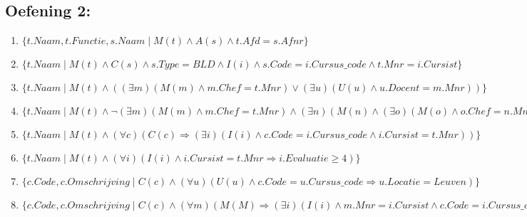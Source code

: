 \documentclass[../Oefenzitting5.tex]{subfiles}
\begin{document}
	\subsection{Oefening 2:}
	\begin{enumerate}
		\item
			$ \{ t.Naam , t.Functie, s.Naam \mid M(t) \wedge A(s) \wedge t.Afd = s.Afnr \} $

	   \item
		   $ \{ t.Naam \mid M(t) \wedge C(s) \wedge s.Type = BLD \wedge I(i) \wedge s.Code = i.Cursus\_code \wedge t.Mnr = i.Cursist \} $ 
		   
		\item
			$ \{ t.Naam \mid M(t) \wedge ((\exists{m}) (M(m) \wedge m.Chef = t.Mnr) \vee (\exists{u}) (U(u) \wedge u.Docent = m.Mnr )) \} $
			
		\item
			$ \{ t.Naam \mid M(t) \wedge \neg (\exists{m})(M(m) \wedge m.Chef = t.Mnr) \wedge (\exists{n})(M(n) \wedge (\exists{o})(M(o) \wedge o.Chef = n.Mnr) \wedge n.Salaris < t.Salaris) \} $
			
		\item
			$ \{ t.Naam \mid M(t) \wedge (\forall{c}) (C(c) \Rightarrow (\exists{i}) (I(i) \wedge c.Code = i.Cursus\_code \wedge i.Cursist = t.Mnr)) \} $
			
		\item
			$ \{ t.Naam \mid M(t) \wedge (\forall{i}) (I(i) \wedge i.Cursist = t.Mnr \Rightarrow i.Evaluatie \geq 4) \} $
			
		\item
			$ \{ c.Code, c.Omschrijving \mid C(c) \wedge (\forall{u}) (U(u) \wedge c.Code = u.Cursus\_code \Rightarrow u.Locatie = Leuven) \} $
			
		\item
			$ \{ c.Code, c.Omschrijving \mid C(c) \wedge (\forall{m}) (M(M) \Rightarrow (\exists{i}) (I(i) \wedge m.Mnr = i.Cursist \wedge c.Code = i.Cursus\_code)) \} $
       
	\end{enumerate}
\end{document}

